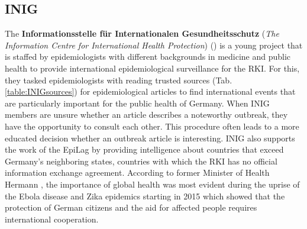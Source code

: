 \subsection{INIG}
  The \textbf{Informationsstelle für Internationalen Gesundheitsschutz} (\textit{The Information Centre for International Health Protection}) () is a young project that is staffed by epidemiologists with different backgrounds in medicine and public health to provide international epidemiological surveillance for the RKI.
  For this, they tasked epidemiologists with reading trusted sources (Tab. \ref{table:INIGsources}) for epidemiological articles to find international events that are particularly important for the public health of Germany.
  When INIG members are unsure whether an article describes a noteworthy outbreak, they have the opportunity to consult each other.
  This procedure often leads to a more educated decision whether an outbreak article is interesting.
  INIG also supports the work of the EpiLag by providing intelligence about countries that exceed Germany's neighboring states, countries with which the RKI has no official information exchange agreement.
  According to former Minister of Health Hermann \citeauthor{Grohe2017}, the importance of global health was most evident during the uprise of the Ebola disease and Zika epidemics starting in 2015 which showed that the protection of German citizens and the aid for affected people requires international cooperation.


